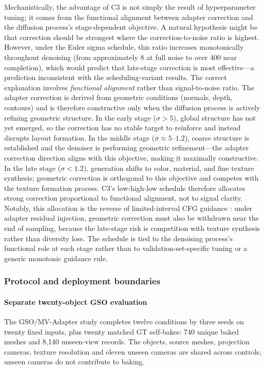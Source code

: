 \documentclass[times,twocolumn,final]{elsarticle}
\providecommand{\DIFadd}[1]{{\protect\color{blue} \sf #1}} %
\providecommand{\DIFdel}[1]{{\protect\color{red} \scriptsize #1}} %
\providecommand{\DIFaddbegin}{} %
\providecommand{\DIFaddend}{} %
\providecommand{\DIFdelbegin}{} %
\providecommand{\DIFdelend}{} %
\begin{document}
\DIFdelbegin \DIFdel{Mechanistically, the advantage of C3 is not simply the result of hyperparameter tuning; it comes from the functional alignment between adapter correction and the diffusion process's stage-dependent objective. A natural hypothesis might be that correction should be strongest where the correction-to-noise ratio is highest. However, under the Euler sigma schedule, this ratio increases monotonically throughout denoising (from approximately 8 at full noise to over 400 near completion), which would predict that late-stage correction is most effective---a prediction inconsistent with the scheduling-variant results. The correct explanation involves \emph{functional alignment} rather than signal-to-noise ratio. The adapter correction is derived from geometric conditions (normals, depth, contours) and is therefore constructive only when the diffusion process is actively refining geometric structure. In the early stage ($\sigma > 5$), global structure has not yet emerged, so the correction has no stable target to reinforce and instead disrupts layout formation. In the middle stage ($\sigma \approx 5$--$1.2$), coarse structure is established and the denoiser is performing geometric refinement---the adapter correction direction aligns with this objective, making it maximally constructive. In the late stage ($\sigma < 1.2$), generation shifts to color, material, and fine texture synthesis; geometric correction is orthogonal to this objective and competes with the texture formation process. C3's low-high-low schedule therefore allocates strong correction proportional to functional alignment, not to signal clarity. Notably, this allocation is the reverse of limited-interval CFG guidance \cite{kynkanniemi2024limited}: under adapter residual injection, geometric correction must also be withdrawn near the end of sampling, because the late-stage risk is competition with texture synthesis rather than diversity loss. The schedule is tied to the denoising process's functional role at each stage rather than to validation-set-specific tuning or a generic monotonic guidance rule.
}\DIFdelend \DIFaddbegin \subsubsection{Protocol and deployment boundaries}
\paragraph{Separate twenty-object GSO evaluation}
\DIFadd{The GSO/MV-Adapter study completes twelve conditions by three seeds on twenty fixed inputs, plus twenty matched GT self-bakes: 740 unique baked meshes and 8,140 unseen-view records. The objects, source meshes, projection cameras, texture resolution and eleven unseen cameras are shared across controls; unseen cameras do not contribute to baking.
}\DIFaddend
\end{document}
